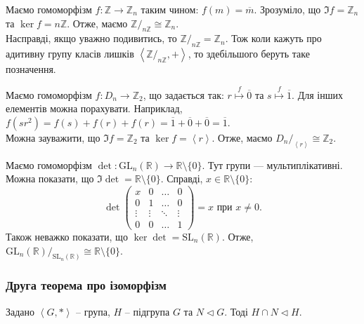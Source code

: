 \documentclass{math_library}
\begin{document}
\begin{example}
Маємо гомоморфізм $f \colon \mathbb{Z} \to \mathbb{Z}_n$ таким чином: $f(m) = \overline{m}$. Зрозуміло, що $\Im f = \mathbb{Z}_n$ та $\ker f = n \mathbb{Z}$. Отже, маємо $\mathbb{Z}/_{n \mathbb{Z}} \cong \mathbb{Z}_n$.\\
Насправді, якщо уважно подивитись, то $\mathbb{Z}/_{n \mathbb{Z}} = \mathbb{Z}_n$. Тож коли кажуть про адитивну групу класів лишків $\left< \mathbb{Z}/_{n \mathbb{Z}}, + \right>$, то здебільшого беруть таке позначення.
\end{example}

\begin{example}
Маємо гомоморфізм $f \colon D_n \to \mathbb{Z}_2$, що задається так: $r \overset{f}{\mapsto} \overline{0}$ та $s \overset{f}{\mapsto} \overline{1}$. Для інших елементів можна порахувати. Наприклад, $f(sr^2) = f(s) + f(r) + f(r)  = \overline{1} + \overline{0} + \overline{0} = \overline{1}$.\\
Можна зауважити, що $\Im f = \mathbb{Z}_2$ та $\ker f = \left<r\right>$. Отже, маємо $D_n/_{\left<r\right>} \cong \mathbb{Z}_2$.
\end{example}

\begin{example}
Маємо гомоморфізм $\det \colon \mathrm{GL}_n(\mathbb{R}) \to \mathbb{R} \setminus \{0\}$. Тут групи --- мультиплікативні. Можна показати, що $\Im \det = \mathbb{R} \setminus \{0\}$. Справді, $x \in \mathbb{R} \setminus \{0\}$:
\[ \det \begin{pmatrix}
x & 0 & \dots & 0 \\
0 & 1 & \dots & 0 \\
\vdots & \vdots & \ddots & \vdots \\
0 & 0 & \dots & 1 
\end{pmatrix} = x \text{ при } x \neq 0.
\]
Також неважко показати, що $\ker \det = \mathrm{SL}_n(\mathbb{R})$. Отже, ${\mathrm{GL}_n(\mathbb{R})}/_{\mathrm{SL}_n(\mathbb{R})} \cong \mathbb{R} \setminus \{0\}$.
\end{example}

\subsubsection{Друга теорема про ізоморфізм}
\iffalse
\begin{lemma}
Задано $\left< G, * \right>$ -- група, $H$ -- підгрупа $G$ та $N \triangleleft G$. Тоді $H \cap N \triangleleft H$.
\end{lemma}
\end{document}
